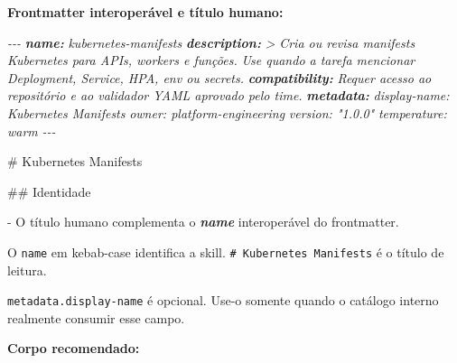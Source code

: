 \documentclass[
  10pt,
  a4paper,
  oneside]{book}
\newenvironment{Shaded}{}{}
\newcommand{\AnnotationTok}[1]{\textcolor[rgb]{0.38,0.63,0.69}{\textbf{\textit{#1}}}}
\newcommand{\CommentTok}[1]{\textcolor[rgb]{0.38,0.63,0.69}{\textit{#1}}}
\newcommand{\FunctionTok}[1]{\textcolor[rgb]{0.02,0.16,0.49}{#1}}
\newcommand{\InformationTok}[1]{\textcolor[rgb]{0.38,0.63,0.69}{\textbf{\textit{#1}}}}
\newcommand{\NormalTok}[1]{#1}
\newcommand{\SpecialStringTok}[1]{\textcolor[rgb]{0.73,0.40,0.53}{#1}}
\begin{document}
\textbf{Frontmatter interoperável e título humano:}

\begin{Shaded}
\begin{Highlighting}[]
\CommentTok{{-}{-}{-}}
\AnnotationTok{name:}\CommentTok{ kubernetes{-}manifests}
\AnnotationTok{description:}\CommentTok{ \textgreater{}}
\CommentTok{  Cria ou revisa manifests Kubernetes para APIs, workers e funções.}
\CommentTok{  Use quando a tarefa mencionar Deployment, Service, HPA, env ou secrets.}
\AnnotationTok{compatibility:}\CommentTok{ Requer acesso ao repositório e ao validador YAML aprovado pelo time.}
\AnnotationTok{metadata:}
\CommentTok{  display{-}name: Kubernetes Manifests}
\CommentTok{  owner: platform{-}engineering}
\CommentTok{  version: "1.0.0"}
\CommentTok{  temperature: warm}
\CommentTok{{-}{-}{-}}

\FunctionTok{\# Kubernetes Manifests}

\FunctionTok{\#\# Identidade}

\SpecialStringTok{{-} }\NormalTok{O título humano complementa o }\InformationTok{\textasciigrave{}name\textasciigrave{}}\NormalTok{ interoperável do frontmatter.}
\end{Highlighting}
\end{Shaded}

O \texttt{name} em kebab-case identifica a skill.
\texttt{\#\ Kubernetes\ Manifests} é o título de leitura.

\texttt{metadata.display-name} é opcional. Use-o somente quando o
catálogo interno realmente consumir esse campo.

\textbf{Corpo recomendado:}
\end{document}
